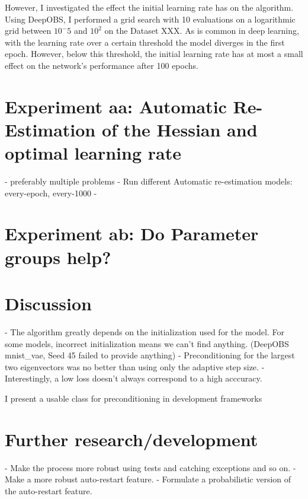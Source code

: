 \documentclass[twoside,12pt,a4paper]{report}
\begin{document}
However, I investigated the effect the initial learning rate has on the algorithm.
Using DeepOBS, I performed a grid search with 10 evaluations on a logarithmic grid between $10^-5$ and $10^2$ on the Dataset XXX.
As is common in deep learning, with the learning rate over a certain threshold the model diverges in the first epoch. However, below this threshold, the initial learning rate has at most a small effect on the network's performance after 100 epochs.

\section{Experiment aa: Automatic Re-Estimation of the Hessian and optimal learning rate}
- preferably multiple problems
- Run different Automatic re-estimation models: every-epoch, every-1000
- 

\section{Experiment ab: Do Parameter groups help?}



\section{Discussion}
\begin{markdown}
- The algorithm greatly depends on the initialization used for the model. For some models, incorrect initialization means we can't find anything. (DeepOBS mnist\_vae, Seed 45 failed to provide anything)
- Preconditioning for the largest two eigenvectors was no better than using only the adaptive step size.
- Interestingly, a low loss doesn't always correspond to a high acccuracy.
\end{markdown}

I present a usable class for preconditioning in development frameworks 
\section{Further research/development}
\begin{markdown}
- Make the process more robust using tests and catching exceptions and so on.
- Make a more robust auto-restart feature.
- Formulate a probabilistic version of the auto-restart feature.
\end{markdown}
\end{document}

